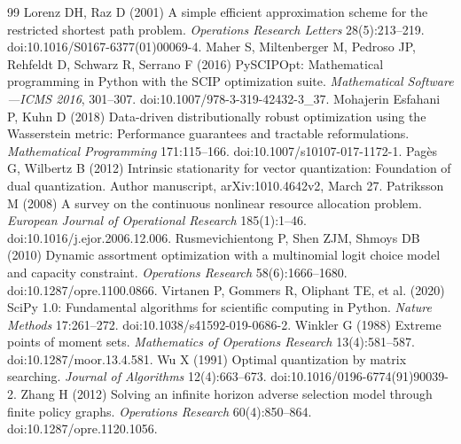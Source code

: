 \begin{thebibliography}{99}
Lorenz DH, Raz D (2001) A simple efficient approximation scheme for the restricted shortest path problem. \emph{Operations Research Letters} 28(5):213--219. doi:10.1016/S0167-6377(01)00069-4.
Maher S, Miltenberger M, Pedroso JP, Rehfeldt D, Schwarz R, Serrano F (2016) PySCIPOpt: Mathematical programming in Python with the SCIP optimization suite. \emph{Mathematical Software---ICMS 2016}, 301--307. doi:10.1007/978-3-319-42432-3\_37.
Mohajerin Esfahani P, Kuhn D (2018) Data-driven distributionally robust optimization using the Wasserstein metric: Performance guarantees and tractable reformulations. \emph{Mathematical Programming} 171:115--166. doi:10.1007/s10107-017-1172-1.
Pag\`es G, Wilbertz B (2012) Intrinsic stationarity for vector quantization: Foundation of dual quantization. Author manuscript, arXiv:1010.4642v2, March 27.
Patriksson M (2008) A survey on the continuous nonlinear resource allocation problem. \emph{European Journal of Operational Research} 185(1):1--46. doi:10.1016/j.ejor.2006.12.006.
Rusmevichientong P, Shen ZJM, Shmoys DB (2010) Dynamic assortment optimization with a multinomial logit choice model and capacity constraint. \emph{Operations Research} 58(6):1666--1680. doi:10.1287/opre.1100.0866.
Virtanen P, Gommers R, Oliphant TE, et al. (2020) SciPy 1.0: Fundamental algorithms for scientific computing in Python. \emph{Nature Methods} 17:261--272. doi:10.1038/s41592-019-0686-2.
Winkler G (1988) Extreme points of moment sets. \emph{Mathematics of Operations Research} 13(4):581--587. doi:10.1287/moor.13.4.581.
Wu X (1991) Optimal quantization by matrix searching. \emph{Journal of Algorithms} 12(4):663--673. doi:10.1016/0196-6774(91)90039-2.
Zhang H (2012) Solving an infinite horizon adverse selection model through finite policy graphs. \emph{Operations Research} 60(4):850--864. doi:10.1287/opre.1120.1056.


\end{thebibliography}
